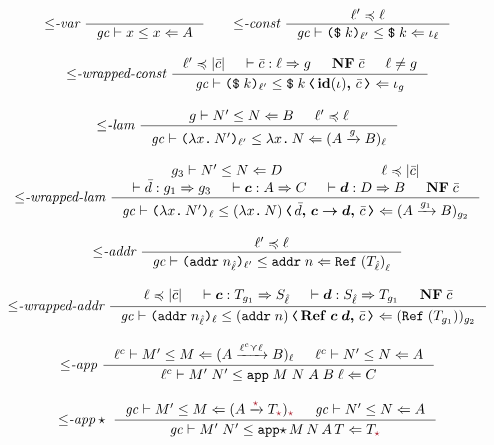 \begin{figure}[tbp]
  \raggedright
  \small
  \begin{gather*}
    {\leq}\textit{-var}~
    \inference{}{\simrel{\gc}{x}{x}{A}}
    \qquad
    {\leq}\textit{-const}~
    \inference{\ell' \preccurlyeq \ell}
              {\gc \vdash \dynconst{k}{\ell'} \leq \ccconst{k} \Leftarrow \iota_{\ell}}
    \\[2ex]
    {\leq}\textit{-wrapped-const}~
    \inference{\ell' \preccurlyeq |\bar{c}| & \vdash \bar{c} : \ell \Rightarrow g & \mathbf{NF}\;\bar{c} & \ell \neq g}
    {\gc \vdash \dynconst{k}{\ell'} \leq \cccast{\ccconst{k}}{\coerc{\id{\iota}}{\bar{c}}} \Leftarrow \iota_g}
    \\[2ex]
    {\leq}\textit{-lam}~
    \inference{\simrel{g}{N'}{N}{B} & \ell' \preccurlyeq \ell}
              {\simrel{\gc}{\dynlam{x}{N'}{\ell'}}{\cclam{x}{N}}{(\Fun{A}{g}{B})_{\ell}}}
    \\[2ex]
    {\leq}\textit{-wrapped-lam}~
    \inference{\simrel{g_3}{N'}{N}{D} & \ell \preccurlyeq |\bar{c}| \\ \vdash \bar{d} : g_1 \Rightarrow g_3 & \vdash \bm{c} : A \Rightarrow C & \vdash \bm{d} : D \Rightarrow B & \mathbf{NF}\;\bar{c}}
              {\simrel{\gc}{\dynlam{x}{N'}{\ell}}{\cccast{(\cclam{x}{N})}{\coerc{\funco{\bar{d}}{\bm{c}}{\bm{d}}}{\bar{c}}}}{(\Fun{A}{g_1}{B})_{g_2}}}
    \\[2ex]
    {\leq}\textit{-addr}~
    \inference{\ell' \preccurlyeq \ell}
              {\simrel{\gc}{\dynaddr{n_{\hat{\ell}}}{\ell'}}{\ccaddr{n}}{\Refer{(T_{\hat{\ell}})}_{\ell}}}
    \\[2ex]
    {\leq}\textit{-wrapped-addr}~
    \inference{\ell \preccurlyeq |\bar{c}| & \vdash \bm{c} : T_{g_1} \Rightarrow S_{\hat{\ell}} & \vdash \bm{d} : S_{\hat{\ell}} \Rightarrow T_{g_1} & \mathbf{NF}\;\bar{c}}
              {\simrel{\gc}{\dynaddr{n_{\hat{\ell}}}{\ell}}{\cccast{(\ccaddr{n})}{\coerc{\refco{\bm{c}}{\bm{d}}}{\bar{c}}}}{(\Refer{(T_{g_1})})_{g_2}}}
    \\[2ex]
    {\leq}\textit{-app}~
    \inference{\simrel{\ell^c}{M'}{M}{(\Fun{A}{\ell^c \curlyvee \ell}{B})_\ell} & \simrel{\ell^c}{N'}{N}{A}}
              {\simrel{\ell^c}{M'\;N'}{\ccapp{M}{N}{A}{B}{\ell}}{C}}
    \\[2ex]
    {\leq}\textit{-app}\star~
    \inference{\simrel{\gc}{M'}{M}{(\Fun{A}{\unk}{T_{\unk}})_{\unk}} & \simrel{\gc}{N'}{N}{A}}
              {\simrel{\gc}{M'\;N'}{\ccappstar{M}{N}{A}{T}{}}{T_{\unk}}}

\end{gather*}
\end{figure}
